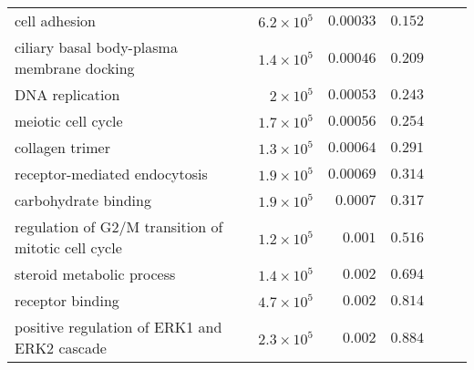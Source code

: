 \begin{longtable*}{|l|r|r|r|r|r|}
    cell adhesion                                       & $6.2\times 10^{5}$ & $0.00033$            & $ 0.152~~$                                               \\
    ciliary basal body-plasma membrane docking          & $1.4\times 10^{5}$ & $0.00046$            & $ 0.209~~$                                               \\
    DNA replication                                     & $ 2\times 10^{5}$  & $0.00053$            & $ 0.243~~$                                               \\
    meiotic cell cycle                                  & $1.7\times 10^{5}$ & $0.00056$            & $ 0.254~~$                                               \\
    collagen trimer                                     & $1.3\times 10^{5}$ & $0.00064$            & $ 0.291~~$                                               \\
    receptor-mediated endocytosis                       & $1.9\times 10^{5}$ & $0.00069$            & $ 0.314~~$                                               \\
    carbohydrate binding                                & $1.9\times 10^{5}$ & $0.0007$             & $ 0.317~~$                                               \\
    regulation of G2/M transition of mitotic cell cycle & $1.2\times 10^{5}$ & $ 0.001$             & $ 0.516~~$                                               \\
    steroid metabolic process                           & $1.4\times 10^{5}$ & $ 0.002$             & $ 0.694~~$                                               \\
    receptor binding                                    & $4.7\times 10^{5}$ & $ 0.002$             & $ 0.814~~$                                               \\
    positive regulation of ERK1 and ERK2 cascade        & $2.3\times 10^{5}$ & $ 0.002$             & $ 0.884~~$                                               \\
\end{longtable*}

